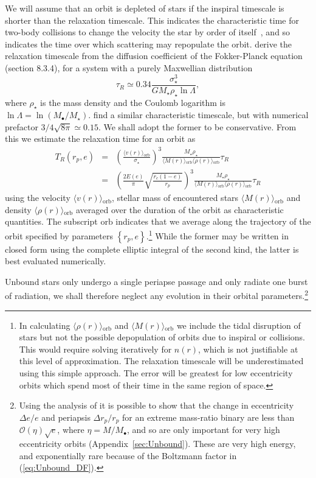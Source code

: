 \documentclass[useAMS,usedcolumn,usegraphicx,usenatbib]{mn2e}
\newcommand{\eqnref}[1]{(\ref{eq:#1})}
\newcommand{\apref}[1]{Appendix~\ref{sec:#1}}
\newcommand{\sub}[1]{\ensuremath{_\mathrm{#1}}}
\newcommand{\order}[1]{\ensuremath{\mathcal{O}({#1})}}
\begin{document}
We will assume that an orbit is depleted of stars if the inspiral timescale is shorter than the relaxation timescale. This indicates the characteristic time for two-body collisions to change the velocity the star by order of itself~\citep{Binney1987}, and so indicates the time over which scattering may repopulate the orbit. \citet{Binney1987} derive the relaxation timescale from the diffusion coefficient of the Fokker-Planck equation (section 8.3.4), for a system with a purely Maxwellian distribution
\begin{equation}
\tau_R \simeq 0.34\frac{\sigma_\star^3}{GM_\star\rho_\star\ln\Lambda},
\end{equation}
where $\rho_\star$ is the mass density and the Coulomb logarithm is $\ln\Lambda = \ln(M_\bullet/M_\star)$. \citet{Bahcall1977} find a similar characteristic timescale, but with numerical prefactor $3/4\sqrt{8\pi} \simeq 0.15$. We shall adopt the former to be conservative. From this we estimate the relaxation time for an orbit as
\begin{eqnarray}
T_R(r_p,e) & = & \left(\frac{\langle v(r)\rangle\sub{orb}}{\sigma_\star}\right)^3\frac{M_\star\rho_\star}{\langle M(r)\rangle\sub{orb}\langle \rho(r)\rangle\sub{orb}}\tau_R\\
 & = & \left(\frac{2 E(e)}{\pi}\sqrt{\frac{r_c(1 - e)}{r_p}}\right)^{3}\frac{M_\star\rho_\star}{\langle M(r)\rangle\sub{orb}\langle \rho(r)\rangle\sub{orb}}\tau_R
\end{eqnarray}
using the velocity $\langle v(r)\rangle\sub{orb}$, stellar mass of encountered stars $\langle M(r)\rangle\sub{orb}$ and density $\langle \rho(r)\rangle\sub{orb}$ averaged over the duration of the orbit as characteristic quantities. The subscript $\mathrm{orb}$ indicates that we average along the trajectory of the orbit specified by parameters $\left\{r_p,e\right\}$.\footnote{In calculating $\langle \rho(r)\rangle\sub{orb}$ and $\langle M(r)\rangle\sub{orb}$ we include the tidal disruption of stars but not the possible depopulation of orbits due to inspiral or collisions. This would require solving iteratively for $n(r)$, which is not justifiable at this level of approximation. The relaxation timescale will be underestimated using this simple approach. The error will be greatest for low eccentricity orbits which spend most of their time in the same region of space.} While the former may be written in closed form using the complete elliptic integral of the second kind, the latter is best evaluated numerically.

Unbound stars only undergo a single periapse passage and only radiate one burst of radiation, we shall therefore neglect any evolution in their orbital parameters.\footnote{Using the analysis of \citet{Turner1977} it is possible to show that the change in eccentricity $\Delta e / e$ and periapsis $\Delta r_p / r_p$ for an extreme mass-ratio binary are less than $\order{\eta}\sqrt{e}$, where $\eta = M/M_\bullet$, and so are only important for very high eccentricity orbits (\apref{Unbound}). These are very high energy, and exponentially rare because of the Boltzmann factor in \eqnref{Unbound_DF}.}
\end{document}
